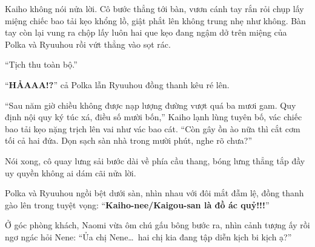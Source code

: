 \documentclass[../main.tex]{subfiles}
\begin{document}
Kaiho không nói nửa lời. Cô bước thẳng tới bàn, vươn cánh tay rắn rỏi chụp lấy miệng chiếc bao tải kẹo khổng lồ, giật phắt lên không trung nhẹ như không. Bàn tay còn lại vung ra chộp lấy luôn hai que kẹo đang ngậm dở trên miệng của Polka và Ryuuhou rồi vứt thẳng vào sọt rác.

``Tịch thu toàn bộ.''

``\textbf{HẢAAA!?}'' cả Polka lẫn Ryuuhou đồng thanh kêu ré lên.

``Sau năm giờ chiều không được nạp lượng đường vượt quá ba mươi gam. Quy định nội quy ký túc xá, điều số mười bốn,'' Kaiho lạnh lùng tuyên bố, vác chiếc bao tải kẹo nặng trịch lên vai như vác bao cát. ``Còn gây ồn ào nữa thì cắt cơm tối cả hai đứa. Dọn sạch sàn nhà trong mười phút, nghe rõ chưa?''

Nói xong, cô quay lưng sải bước dài về phía cầu thang, bóng lưng thẳng tắp đầy uy quyền không ai dám cãi nửa lời.

Polka và Ryuuhou ngồi bệt dưới sàn, nhìn nhau với đôi mắt đẫm lệ, đồng thanh gào lên trong tuyệt vọng: ``\textbf{Kaiho-nee/Kaigou-san là đồ ác quỷ!!!}''

Ở góc phòng khách, Naomi vừa ôm chú gấu bông bước ra, nhìn cảnh tượng ấy rồi ngơ ngác hỏi Nene: ``Ủa chị Nene\dots\ hai chị kia đang tập diễn kịch bi kịch ạ?''
\end{document}
